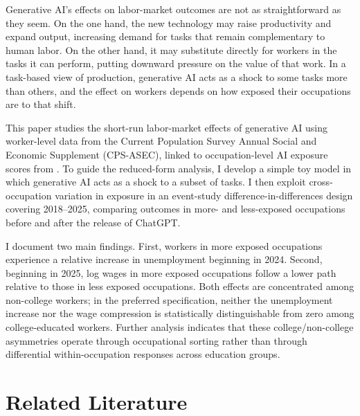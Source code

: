 \documentclass[11pt]{article}
\theoremstyle{plain}
\theoremstyle{remark}
\begin{document}
Generative AI's effects on labor-market outcomes are not as straightforward as they seem. On the one hand, the new technology may raise productivity and expand output, increasing demand for tasks that remain complementary to human labor. On the other hand, it may substitute directly for workers in the tasks it can perform, putting downward pressure on the value of that work.  In a task-based view of production, generative AI acts as a shock to some tasks more than others, and the effect on workers depends on how exposed their occupations are to that shift.

This paper studies the short-run labor-market effects of generative AI using worker-level data from the Current Population Survey Annual Social and Economic Supplement (CPS-ASEC), linked to occupation-level AI exposure scores from \textcite{eloundou2024gpts}. To guide the reduced-form analysis, I develop a simple toy model in which generative AI acts as a shock to a subset of tasks. I then exploit cross-occupation variation in exposure in an event-study difference-in-differences design covering 2018--2025, comparing outcomes in more- and less-exposed occupations before and after the release of ChatGPT.

I document two main findings. First, workers in more exposed occupations experience a relative increase in unemployment beginning in 2024. Second, beginning in 2025, log wages in more exposed occupations follow a lower path relative to those in less exposed occupations. Both effects are concentrated among non-college workers; in the preferred specification, neither the unemployment increase nor the wage compression is statistically distinguishable from zero among college-educated workers. Further analysis indicates that these college/non-college asymmetries operate through occupational sorting rather than through differential within-occupation responses across education groups.

\section{Related Literature}
\label{sec:background}
\end{document}
